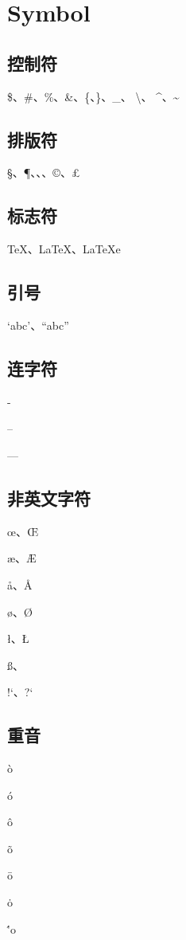 \documentclass[UTF8]{ctexrep}
\begin{document}
\section{Symbol}

\subsection{控制符}
\$、\#、\%、\&、\{、\}、\_、
\textbackslash、
\^{}、\~{}

\subsection{排版符}
\S、\P、\dag、\ddag、\copyright、\pounds

\subsection{标志符}
\TeX{}、LaTeX{}、LaTeXe{}

\subsection{引号}
`abc'、``abc''

\subsection{连字符}
\par -
\par --
\par ---

\subsection{非英文字符}
\par \oe、\OE
\par \ae、\AE
\par \aa、\AA
\par \o、\O
\par \l、\L
\par \ss、\SS
\par !`、?`

\subsection{重音}
\par \`o
\par \'o
\par \^o
\par \~o
\par \=o
\par \.o
\par \''o
\end{document}
